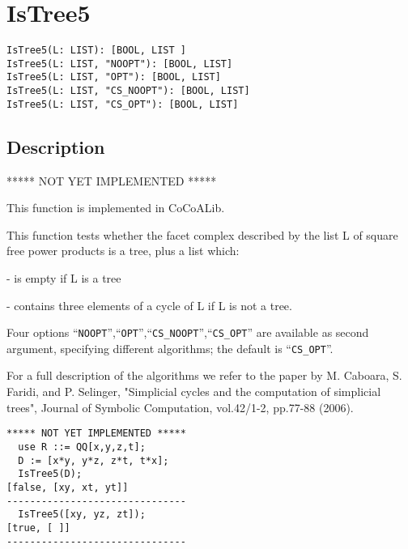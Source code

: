 \documentclass[a4paper]{mybook}
\newenvironment{command}{}{} %
\begin{document}
\section{IsTree5}
\label{IsTree5}
\begin{command} %


\begin{Verbatim}[label=syntax, rulecolor=\color{MidnightBlue},
frame=single]
IsTree5(L: LIST): [BOOL, LIST ]
IsTree5(L: LIST, "NOOPT"): [BOOL, LIST]
IsTree5(L: LIST, "OPT"): [BOOL, LIST]
IsTree5(L: LIST, "CS_NOOPT"): [BOOL, LIST]
IsTree5(L: LIST, "CS_OPT"): [BOOL, LIST]
\end{Verbatim}


\subsection*{Description}

***** NOT YET IMPLEMENTED *****
\par 
This function is implemented in CoCoALib.
\par 
This function tests whether the facet complex described by the
list L of square free power products is a tree, plus a list which:
\par 
- is empty if L is a tree
\par 
- contains three elements of a cycle of L if L is not a tree.
\par 
Four options ``\verb&NOOPT&'',``\verb&OPT&'',``\verb&CS_NOOPT&'',``\verb&CS_OPT&'' are available as second
argument, specifying different algorithms; the default is ``\verb&CS_OPT&''.
\par 
For a full description of the algorithms we refer to the paper by
M. Caboara, S. Faridi, and P. Selinger, "Simplicial cycles and
the computation of simplicial trees", Journal of Symbolic Computation,
vol.42/1-2, pp.77-88 (2006).
\begin{Verbatim}[label=example, rulecolor=\color{PineGreen}, frame=single]
***** NOT YET IMPLEMENTED *****
  use R ::= QQ[x,y,z,t];
  D := [x*y, y*z, z*t, t*x];
  IsTree5(D);
[false, [xy, xt, yt]]
-------------------------------
  IsTree5([xy, yz, zt]);
[true, [ ]]
-------------------------------
\end{Verbatim}


\end{command} %
\end{document}
